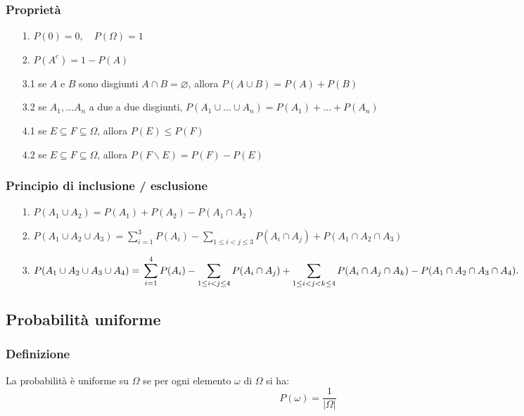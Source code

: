 \documentclass[a4paper]{article}
\begin{document}
\subsubsection*{Proprietà}
\begin{itemize}[topsep=3pt, itemsep=0pt]
	\item[1.] \(P(0) = 0, \quad P(\Omega) = 1\)
	\item[2.] \(P(A^c) = 1-P(A)\)
	\item[3.1] se \(A\) e \(B\) sono disgiunti \(A \cap B = \varnothing\), allora \(P(A \cup B) = P(A) + P(B)\)
	\item[3.2] se \(A_1, \dots A_n\) a due a due disgiunti, \(P(A_1 \cup \dots \cup A_n) = P(A_1) + \dots + P(A_n)\)
	\item[4.1] se \(E \subseteq F \subseteq \Omega\), allora \(P(E) \leq P(F)\)
	\item[4.2] se \(E \subseteq F \subseteq \Omega\), allora \(P(F \backslash E) = P(F) - P(E)\)
\end{itemize}

\subsubsection*{Principio di inclusione / esclusione}
\begin{itemize}
	\item[1.] \(P(A_1 \cup A_2) = P(A_1) + P(A_2) - P(A_1 \cap A_2)\)
	\item[2.] \(\displaystyle P(A_1 \cup A_2 \cup A_3) = \sum_{i=1}^3 P(A_i) - \sum_{1 \leq i < j \leq 3} P(A_i \cap A_j) + P(A_1 \cap A_2 \cap A_3)\)
	\item[3.] \(\displaystyle P(A_1 \cup A_2 \cup A_3 \cup A_4) = \\ \sum_{i=1}^4 P(A_i) - \sum_{1 \leq i < j \leq 4} P(A_i \cap A_j) + \sum_{1 \leq i < j < k \leq 4} P(A_i \cap A_j \cap A_k) - P(A_1 \cap A_2 \cap A_3 \cap A_4).
\)
\end{itemize}

\subsection{Probabilità uniforme}
\subsubsection*{Definizione}
La probabilità è uniforme su \(\Omega\) se per ogni elemento \(\omega\) di \(\Omega\) si ha: \[\displaystyle P(\omega) = \frac{1}{|\Omega|}\]
\end{document}
